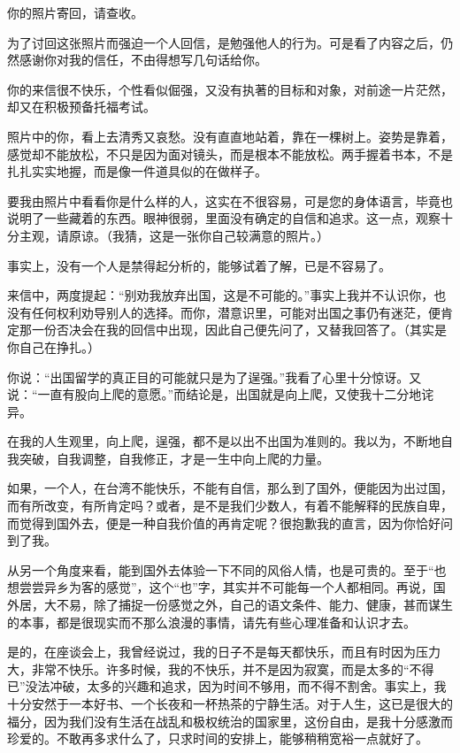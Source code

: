 \par {}
\par 你的照片寄回，请查收。
\par 为了讨回这张照片而强迫一个人回信，是勉强他人的行为。可是看了内容之后，仍然感谢你对我的信任，不由得想写几句话给你。
\par 你的来信很不快乐，个性看似倔强，又没有执著的目标和对象，对前途一片茫然，却又在积极预备托福考试。
\par 照片中的你，看上去清秀又哀愁。没有直直地站着，靠在一棵树上。姿势是靠着，感觉却不能放松，不只是因为面对镜头，而是根本不能放松。两手握着书本，不是扎扎实实地握，而是像一件道具似的在做样子。
\par 要我由照片中看看你是什么样的人，这实在不很容易，可是您的身体语言，毕竟也说明了一些藏着的东西。眼神很弱，里面没有确定的自信和追求。这一点，观察十分主观，请原谅。（我猜，这是一张你自己较满意的照片。）
\par 事实上，没有一个人是禁得起分析的，能够试着了解，已是不容易了。
\par 来信中，两度提起：“别劝我放弃出国，这是不可能的。”事实上我并不认识你，也没有任何权利劝导别人的选择。而你，潜意识里，可能对出国之事仍有迷茫，便肯定那一份否决会在我的回信中出现，因此自己便先问了，又替我回答了。（其实是你自己在挣扎。）
\par 你说：“出国留学的真正目的可能就只是为了逞强。”我看了心里十分惊讶。又说：“一直有股向上爬的意愿。”而结论是，出国就是向上爬，又使我十二分地诧异。
\par 在我的人生观里，向上爬，逞强，都不是以出不出国为准则的。我以为，不断地自我突破，自我调整，自我修正，才是一生中向上爬的力量。
\par 如果，一个人，在台湾不能快乐，不能有自信，那么到了国外，便能因为出过国，而有所改变，有所肯定吗？或者，是不是我们少数人，有着不能解释的民族自卑，而觉得到国外去，便是一种自我价值的再肯定呢？很抱歉我的直言，因为你恰好问到了我。
\par 从另一个角度来看，能到国外去体验一下不同的风俗人情，也是可贵的。至于“也想尝尝异乡为客的感觉”，这个“也”字，其实并不可能每一个人都相同。再说，国外居，大不易，除了捕捉一份感觉之外，自己的语文条件、能力、健康，甚而谋生的本事，都是很现实而不那么浪漫的事情，请先有些心理准备和认识才去。
\par 是的，在座谈会上，我曾经说过，我的日子不是每天都快乐，而且有时因为压力大，非常不快乐。许多时候，我的不快乐，并不是因为寂寞，而是太多的“不得已”没法冲破，太多的兴趣和追求，因为时间不够用，而不得不割舍。事实上，我十分安然于一本好书、一个长夜和一杯热茶的宁静生活。对于人生，这已是很大的福分，因为我们没有生活在战乱和极权统治的国家里，这份自由，是我十分感激而珍爱的。不敢再多求什么了，只求时间的安排上，能够稍稍宽裕一点就好了。
